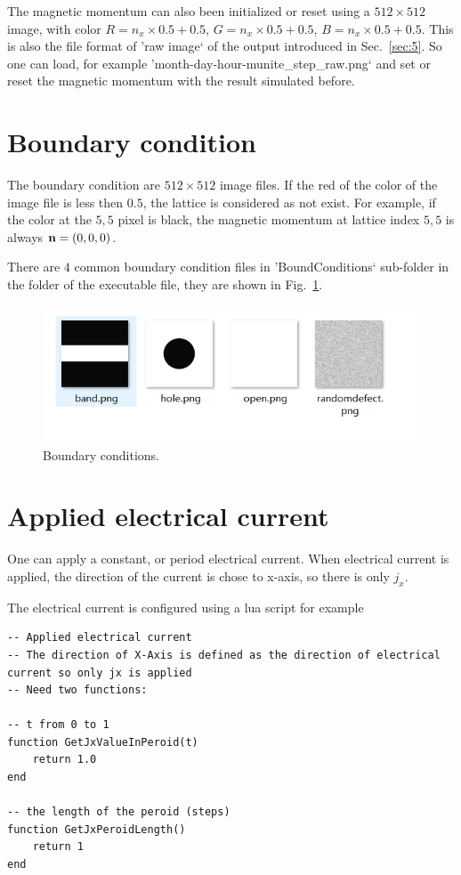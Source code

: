 \documentclass[aps,superscriptaddress,groupedaddress]{revtex4}  %
\begin{document}
The magnetic momentum can also been initialized or reset using a $512\times 512$ image, with color $R=n_x\times 0.5+0.5$, $G=n_x\times 0.5+0.5$, $B=n_x\times 0.5+0.5$. This is also the file format of 'raw image` of the output introduced in Sec.~\ref{sec:5}. So one can load, for example 'month-day-hour-munite\_step\_raw.png` and set or reset the magnetic momentum with the result simulated before.

\section{\label{sec:4}Boundary condition}

The boundary condition are $512\times 512$ image files. If the red of the color of the image file is less then $0.5$, the lattice is considered as not exist. For example, if the color at the $5, 5$ pixel is black, the magnetic momentum at lattice index $5,5$ is always ${\bf n}=(0,0,0)$.

There are $4$ common boundary condition files in 'BoundConditions` sub-folder in the folder of the executable file, they are shown in Fig.~\ref{Fig:boundary}.
\begin{figure}
\includegraphics[scale=0.5]{boundary.png}
\caption{\label{Fig:boundary}Boundary conditions.}
\end{figure}

\section{\label{sec:5}Applied electrical current}

One can apply a constant, or period electrical current. When electrical current is applied, the direction of the current is chose to x-axis, so there is only $j_x$.

The electrical current is configured using a lua script for example
\begin{lstlisting}
-- Applied electrical current
-- The direction of X-Axis is defined as the direction of electrical current so only jx is applied
-- Need two functions:

-- t from 0 to 1
function GetJxValueInPeroid(t)
    return 1.0
end

-- the length of the peroid (steps)
function GetJxPeroidLength()
    return 1
end
\end{lstlisting}
\end{document}
